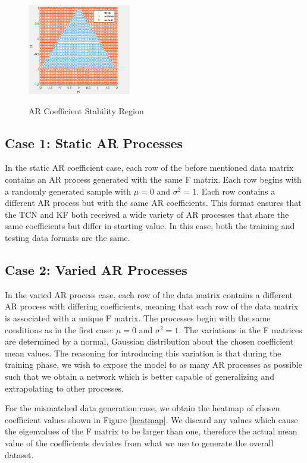 \documentclass[twocolumn,letterpaper]{IEEEAerospaceCLS}  %
\begin{document}
\begin{figure}[!h]
	\centering\includegraphics[width=0.4\textwidth]{figs/stability.png}\\
	\caption{AR Coefficient Stability Region}
	\label{stabf1f2}
\end{figure}

\subsection{Case 1: Static AR Processes}

In the static AR coefficient case, each row of the before mentioned data matrix contains an AR process generated with the same F matrix. Each row begins with a randomly generated sample with $\mu = 0$ and $\sigma^2 = 1$. Each row contains a different AR process but with the same AR coefficients. This format ensures that the TCN and KF both received a wide variety of AR processes that share the same coefficients but differ in starting value. In this case, both the training and testing data formats are the same. 

\subsection{Case 2: Varied AR Processes}

In the varied AR process case, each row of the data matrix contains a different AR process with differing coefficients, meaning that each row of the data matrix is associated with a unique F matrix.  The processes begin with the same conditions as in the first case:  $\mu = 0$ and $\sigma^2 = 1$. The variations in the F matrices are determined by a normal, Gaussian distribution about the chosen coefficient mean values. The reasoning for introducing this variation is that during the training phase, we wish to expose the model to as many AR processes as possible such that we obtain a network which is better capable of generalizing and extrapolating to other processes. 

For the mismatched data generation case, we obtain the heatmap of chosen coefficient values shown in Figure \ref{heatmap}. We discard any values which cause the eigenvalues of the F matrix to be larger than one, therefore the actual mean value of the coefficients deviates from what we use to generate the overall dataset. 
\end{document}
